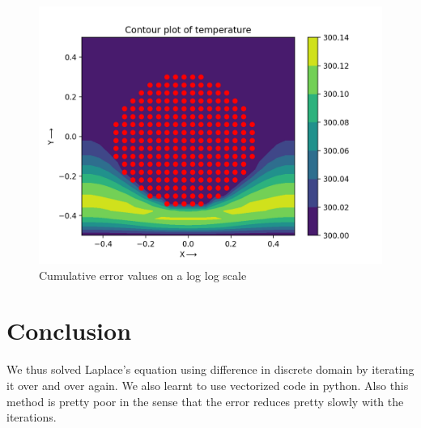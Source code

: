 \documentclass[11pt, a4paper]{article}
\begin{document}
\begin{figure}[h!]
\centering
\includegraphics[scale=0.6]{Fig-8.png}
\caption{Cumulative error values on a log log scale}
\label{fig:3d Plot of Potential}
\end{figure}


\section{Conclusion}
We thus solved Laplace's equation using difference in discrete domain by iterating it over and over again. We also learnt to use vectorized code in python. Also this method is pretty poor in the sense that the error reduces pretty slowly with the iterations.
\end{document}
